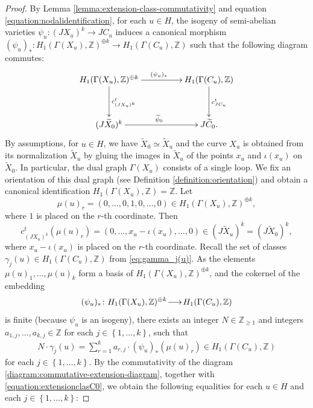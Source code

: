 \documentclass[a4paper,11pt,reqno]{amsart}
\makeatletter
\numberwithin{equation}{section}
\theoremstyle{plain}
\theoremstyle{definition}
\newcommand{\Z}{\mathbb Z}
\newcommand{\wt}[1]{{\widetilde{#1}}}
\renewcommand{\longrightarrow}{\xymatrix@1@=15pt{\ar[r]&}}
\renewcommand{\cong}{\simeq}
\newcommand{\set}[1]{\left\{ #1 \right\}}
\makeatother
\begin{document}
\begin{proof}
By Lemma \ref{lemma:extension-class-commutativity} and equation \eqref{equation:nodalidentification}, for each $u \in H$, the isogeny of semi-abelian varieties $\psi_u \colon (JX_u)^k\to JC_u $ induces a canonical morphism $(\psi_u)_\ast \colon H_1(\Gamma(X_u),\Z)^{\oplus k}  \to H_1(\Gamma(C_u),\Z) $ such that the following diagram commutes:
\begin{align}
\label{diagram:commutative-extension-diagram}
\xymatrixcolsep{4pc}
\xymatrixrowsep{3pc}
\begin{split}
\xymatrix{
H_1(\Gamma(X_u),\Z)^{\oplus k} \ar[r]^{(\psi_u)_\ast} \ar[d]^{c^t_{(JX_u)^k}} & H_1(\Gamma(C_u),\Z) \ar[d]^{c^t_{JC_u}} \\
(J \wt X_0)^k \ar[r]^{\wt \psi_0} & J \wt C_0.
}
\end{split}
\end{align}
By assumptions, for $u \in H$, we have $\wt X_0 \cong \wt X_u$ and the curve $X_u$ is obtained from its normalization $\wt X_u$ by gluing the images in $\wt X_u$ of the points $x_u$ and $\iota(x_u)$ on $\wt X_0$.
 In particular, the dual graph $\Gamma(X_u)$ consists of a single loop.
 We fix an orientation of this dual graph (see Definition \ref{definition:orientation}) and obtain a canonical identification $H_1(\Gamma(X_u),\Z)=\Z$.
 Let
$$
\mu(u)_r = (0, \dotsc,0, 1,0, \dotsc, 0) \in H_1(\Gamma(X_u),\Z)^{\oplus k},
$$
where $1$ is placed on the $r$-th coordinate. 
Then
\[
c^t_{(JX_u)^k}
\left(
\mu(u)_r
\right) 
= 
\left(
0, \dotsc, x_u - \iota(x_u), \dotsc, 0
\right)  \in (J \wt X_u )^k = (J \wt X_0)^k,
\] 
where $x_u - \iota(x_u)$ is placed on the $r$-th coordinate. 
Recall the set of classes $\gamma_j(u)\in H_1(\Gamma(C_u),\Z)$ from \eqref{eq:gamma_j(u)}.
As the elements $\mu(u)_1, \dotsc, \mu(u)_k$ form a basis of $H_1(\Gamma(X_u),\Z)^{\oplus k}$, and the cokernel of the embedding
$$
(\psi_u)_\ast \colon 
H_1(\Gamma(X_u),\Z)^{\oplus k} \longrightarrow H_1(\Gamma(C_u),\Z)
$$
is finite (because $\psi_u$ is an isogeny), there exists an integer $N \in \Z_{\geq 1}$ and integers
$a_{1,j}, \dotsc, a_{k,j} \in \Z$ for each $j \in \set{1, \dotsc, k}$, such that
\begin{align} \label{equation:composition-pointonjac}
N \cdot \gamma_{j}(u) = \sum_{r = 1}^k a_{r,j} \cdot (\psi_u)_\ast (\mu(u)_r) \in H_1(\Gamma(C_u),\Z)
\end{align}
for each $j \in \set{1, \dotsc, k}$. 
By the commutativity of the diagram \eqref{diagram:commutative-extension-diagram}, together with \eqref{equation:extensionclasC0}, we obtain the following equalities for each $u \in H$ and each $j \in \set{1, \dotsc, k}$: 

\end{proof}
\end{document}
